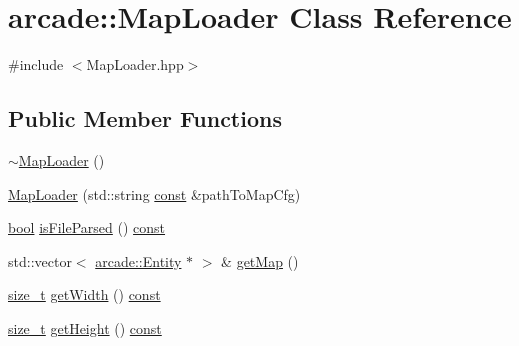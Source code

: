 \hypertarget{classarcade_1_1_map_loader}{\section{arcade\-:\-:Map\-Loader Class Reference}
\label{classarcade_1_1_map_loader}
}


{\ttfamily \#include $<$Map\-Loader.\-hpp$>$}

\subsection*{Public Member Functions}
\begin{DoxyCompactItemize}
\item 
\hyperlink{classarcade_1_1_map_loader_a5c5d32cb1192a30d8bc642b5736271f5}{$\sim$\-Map\-Loader} ()
\item 
\hyperlink{classarcade_1_1_map_loader_a7daca87e6e5032e9c20d3f11d77715a6}{Map\-Loader} (std\-::string \hyperlink{term__entry_8h_a57bd63ce7f9a353488880e3de6692d5a}{const} \&path\-To\-Map\-Cfg)
\item 
\hyperlink{term__entry_8h_a002004ba5d663f149f6c38064926abac}{bool} \hyperlink{classarcade_1_1_map_loader_a325f1050566118b1d032a1a4bf71afd2}{is\-File\-Parsed} () \hyperlink{term__entry_8h_a57bd63ce7f9a353488880e3de6692d5a}{const} 
\item 
std\-::vector$<$ \hyperlink{classarcade_1_1_entity}{arcade\-::\-Entity} $\ast$ $>$ \& \hyperlink{classarcade_1_1_map_loader_aa79541cba517df198f496ce6be90d2f1}{get\-Map} ()
\item 
\hyperlink{nc__alloc_8h_a7b60c5629e55e8ec87a4547dd4abced4}{size\-\_\-t} \hyperlink{classarcade_1_1_map_loader_a66a9c8b7235eb7cd3aee77bd342ba135}{get\-Width} () \hyperlink{term__entry_8h_a57bd63ce7f9a353488880e3de6692d5a}{const} 
\item 
\hyperlink{nc__alloc_8h_a7b60c5629e55e8ec87a4547dd4abced4}{size\-\_\-t} \hyperlink{classarcade_1_1_map_loader_a5e8cd5b7d9d5a4d9f851a1d591471610}{get\-Height} () \hyperlink{term__entry_8h_a57bd63ce7f9a353488880e3de6692d5a}{const} 
\end{DoxyCompactItemize}


